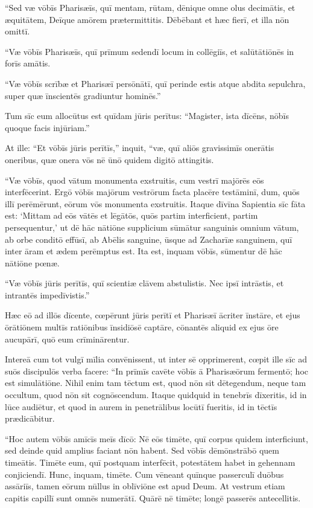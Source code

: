 \Versus ``Sed væ vōbīs Pharisæīs, quī mentam, rūtam, dēnique omne olus decimātis, et æquitātem, Deīque amōrem prætermittitis. Dēbēbant et hæc fierī, et illa nōn omittī.

\Versus ``Væ vōbīs Pharisæīs, quī prīmum sedendī locum in collēgiīs, et salūtātiōnēs in forīs amātis.

\Versus ``Væ vōbīs scrībæ et Pharisæī persōnātī, quī perinde estis atque abdita sepulchra, super quæ īnscientēs gradiuntur hominēs.''

\Versus Tum sīc eum allocūtus est quīdam jūris perītus: ``Magister, ista dīcēns, nōbīs quoque facis injūriam.''

\Versus At ille: ``Et vōbīs jūris perītīs,'' inquit, ``væ, quī aliōs gravissimīs onerātis oneribus, quæ onera vōs nē ūnō quidem digitō attingitis.

\Versus ``Væ vōbīs, quod vātum monumenta exstruitis, cum vestrī majōrēs eōs interfēcerint.
\Versus Ergō vōbīs majōrum vestrōrum facta placēre testāminī, dum, quōs illī perēmērunt, eōrum vōs monumenta exstruitis.
\Versus Itaque dīvīna Sapientia sīc fāta est: `Mittam ad eōs vātēs et lēgātōs, quōs partim interficient, partim persequentur,'
\Versus ut dē hāc nātiōne supplicium sūmātur sanguinis omnium vātum, ab orbe conditō effūsī,
\Versus ab Abēlis sanguine, ūsque ad Zacharīæ sanguinem, quī inter āram et ædem perēmptus est. Ita est, inquam vōbīs, sūmentur dē hāc nātiōne pœnæ.

\Versus ``Væ vōbīs jūris perītīs, quī scientiæ clāvem abstulistis. Nec ipsī intrāstis, et intrantēs impedīvistis.''

\Versus Hæc eō ad illōs dīcente, cœpērunt jūris perītī et Pharisæī ācriter īnstāre, et ejus ōrātiōnem multīs ratiōnibus īnsidiōsē captāre,
\Versus cōnantēs aliquid ex ejus ōre aucupārī, quō eum crīminārentur.



\Caput
\Versus Intereā cum tot vulgī mīlia convēnissent, ut inter sē opprimerent, cœpit ille sīc ad suōs discipulōs verba facere: ``In prīmīs cavēte vōbīs ā Pharisæōrum fermentō; hoc est simulātiōne.
\Versus Nihil enim tam tēctum est, quod nōn sit dētegendum, neque tam occultum, quod nōn sit cognōscendum.
\Versus Itaque quidquid in tenebrīs dīxeritis, id in lūce audiētur, et quod in aurem in penetrālibus locūtī fueritis, id in tēctīs prædicābitur.

\Versus ``Hoc autem vōbīs amīcīs meīs dīcō: Nē eōs timēte, quī corpus quidem interficiunt, sed deinde quid amplius faciant nōn habent.
\Versus Sed vōbīs dēmōnstrābō quem timeātis. Timēte eum, quī postquam interfēcit, potestātem habet in gehennam conjiciendī. Hunc, inquam, timēte.
\Versus Cum vēneant quīnque passerculī duōbus assāriīs, tamen eōrum nūllus in oblīviōne est apud Deum.
\Versus At vestrum etiam capitis capillī sunt omnēs numerātī. Quārē nē timēte; longē passerēs antecellitis.

